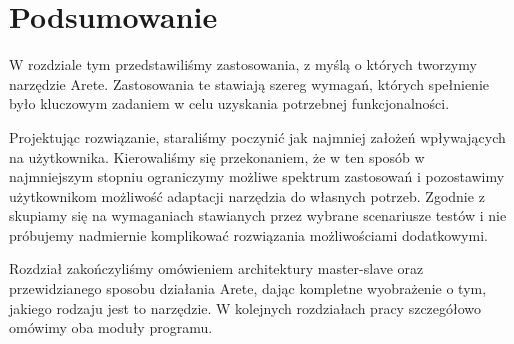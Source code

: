 \documentclass[00-praca-magisterska.tex]{subfiles}
\begin{document}
\section{Podsumowanie}
\label{arete-podsumowanie}

W rozdziale tym przedstawiliśmy zastosowania, z myślą o których tworzymy
narzędzie Arete. Zastosowania te stawiają szereg wymagań, których spełnienie
było kluczowym zadaniem w celu uzyskania potrzebnej funkcjonalności.

Projektując rozwiązanie, staraliśmy poczynić jak najmniej założeń
wpływających na użytkownika. Kierowaliśmy się przekonaniem, że w ten sposób w
najmniejszym stopniu ograniczymy możliwe spektrum zastosowań i pozostawimy
użytkownikom możliwość adaptacji narzędzia do własnych potrzeb. Zgodnie z
\cite{automation-fail,practical-automated} skupiamy się na wymaganiach
stawianych przez wybrane scenariusze testów i nie próbujemy nadmiernie
komplikować rozwiązania możliwościami dodatkowymi.

Rozdział zakończyliśmy omówieniem architektury master-slave oraz przewidzianego
sposobu działania Arete, dając kompletne wyobrażenie o tym, jakiego rodzaju
jest to narzędzie. W kolejnych rozdziałach pracy szczegółowo omówimy oba moduły
programu.
\end{document}
